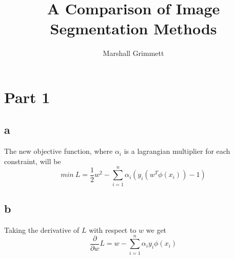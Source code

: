 \documentclass{article}
\title{A Comparison of Image Segmentation Methods}
\author{Marshall Grimmett}
\begin{document}
\setlength{\parindent}{0pt}
\maketitle





\section{Part 1}

\subsection{a}
The new objective function, where $\alpha_i$ is a lagrangian multiplier
for each constraint, will be
\begin{equation*}
  min\ L = \frac{1}{2}w^2 - \sum_{i=1}^{n}\alpha_i(y_i(w^T \phi(x_i)) - 1)
\end{equation*}

\subsection{b}
Taking the derivative of $L$ with respect to $w$ we get
\begin{equation*}
  \frac{\partial}{\partial w} L = w - \sum_{i=1}^{n}\alpha_i y_i \phi(x_i)
\end{equation*}
\end{document}
